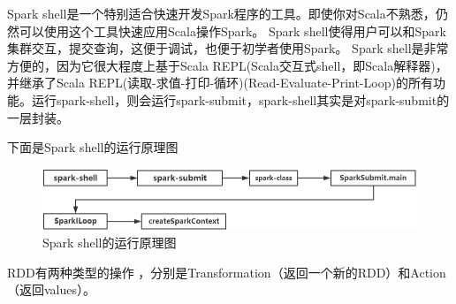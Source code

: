 \documentclass[UTF8]{report}
\begin{document}
Spark shell是一个特别适合快速开发Spark程序的工具。即使你对Scala不熟悉，仍然可以使用这个工具快速应用Scala操作Spark。
Spark shell使得用户可以和Spark集群交互，提交查询，这便于调试，也便于初学者使用Spark。
Spark shell是非常方便的，因为它很大程度上基于Scala REPL(Scala交互式shell，即Scala解释器)，并继承了Scala REPL(读取-求值-打印-循环)(Read-Evaluate-Print-Loop)的所有功能。运行spark-shell，则会运行spark-submit，spark-shell其实是对spark-submit的一层封装。

下面是Spark shell的运行原理图

\begin{figure}[htbp]
    \centering
    \includegraphics[width=\linewidth]{spark/spark-shell.png}    
    \caption{Spark shell的运行原理图}
    \label{fig:spark_shell}
\end{figure}
RDD有两种类型的操作 ，分别是Transformation（返回一个新的RDD）和Action（返回values）。
\end{document}
